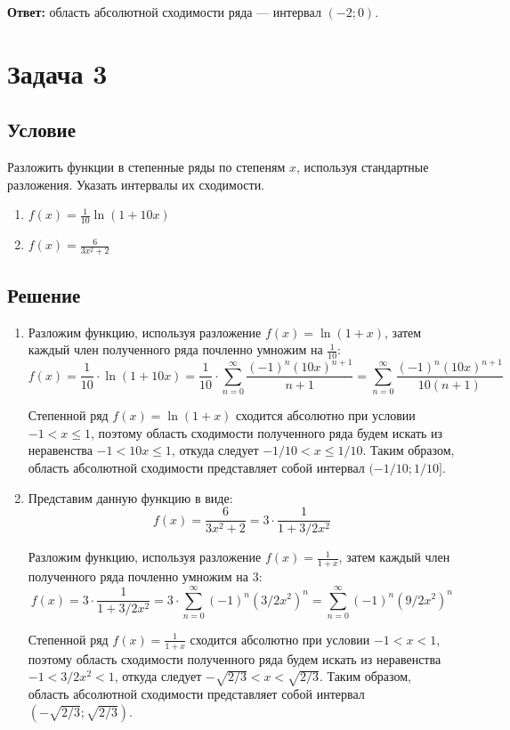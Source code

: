 \documentclass[12pt]{article}
\begin{document}
	\hspace{150pt}\textbf{Ответ:} область абсолютной сходимости ряда --- интервал $ (-2;0) $.

	\newpage

	\section*{Задача 3}	
	\subsection*{Условие}
	
	Разложить функции в степенные ряды по степеням $ x $, используя стандартные разложения. Указать интервалы их сходимости.

	\begin{enumerate}
		\item $ f(x) = \frac{1}{10} \ln{(1 + 10x)} $
		\item $ f(x) = \frac{6}{3x^2 + 2} $
	\end{enumerate}

	\subsection*{Решение}

	\begin{enumerate}[wide, labelwidth=!, labelindent=0pt]
		\item Разложим функцию, используя разложение $ f(x) = \ln{(1 + x)} $, затем каждый член полученного ряда почленно умножим на $ \frac{1}{10} $:
		$$ f(x) = \frac{1}{10} \cdot \ln{(1 + 10x)} = \frac{1}{10} \cdot \sum_{n=0}^{\infty} \frac{(-1)^{n} (10x)^{n+1}}{n + 1} = \sum_{n=0}^{\infty} \frac{(-1)^{n} (10x)^{n+1}}{10(n + 1)} $$

		Степенной ряд $ f(x) = \ln{(1 + x)} $ сходится абсолютно при условии $ -1 < x \leq 1  $, поэтому область сходимости полученного ряда будем искать из неравенства $ -1 < 10x \leq 1  $, откуда следует $ -1/10 < x \leq 1/10  $. Таким образом, область абсолютной сходимости представляет собой интервал $ (-1/10;1/10] $.

		\item Представим данную функцию в виде:
		$$ f(x) = \frac{6}{3x^2 + 2} = 3 \cdot \frac{1}{1 + 3/2x^2} $$

		Разложим функцию, используя разложение $ f(x) = \frac{1}{1 + x} $, затем каждый член полученного ряда почленно умножим на $ 3 $:
		$$ f(x) = 3 \cdot \frac{1}{1 + 3/2x^2} = 3 \cdot \sum_{n=0}^{\infty} (-1)^{n} (3/2x^2)^n  = \sum_{n=0}^{\infty} (-1)^{n} (9/2x^2)^n $$

		Степенной ряд  $ f(x) = \frac{1}{1 + x} $ сходится абсолютно при условии $ -1 < x < 1  $, поэтому область сходимости полученного ряда будем искать из неравенства $ -1 < 3/2x^2 < 1  $, откуда следует $ -\sqrt{2/3} < x < \sqrt{2/3} $. Таким образом, область абсолютной сходимости представляет собой интервал $ (-\sqrt{2/3};\sqrt{2/3}) $.
	\end{enumerate}
\end{document}
